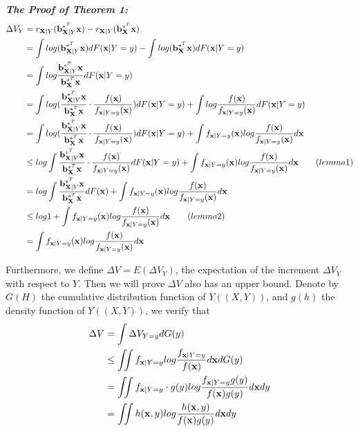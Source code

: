 \documentclass{gapd}
\begin{document}
\noindent\it{\textbf{The Proof of Theorem 1:}}
\begin{equation}
\begin{aligned}
\Delta V_Y&=r_{\mathbf{X}|Y}(\mathbf{b}_{\mathbf{X}|Y}^{*^T}\mathbf{x})-r_{\mathbf{X}|Y}(\mathbf{b}_{\mathbf{X}}^{*^T}\mathbf{x})\\
&=\int log(\mathbf{b}_{\mathbf{X}|Y}^{*^T}\mathbf{x})dF(\mathbf{x}|Y=y)-\int log(\mathbf{b}_{\mathbf{X}}^{*^T}\mathbf{x})dF(\mathbf{x}|Y=y)\\
&=\int log\frac{\mathbf{b}_{\mathbf{X}|Y}^{*^T}\mathbf{x}}{\mathbf{b}_{\mathbf{X}}^{*^T}\mathbf{x}}dF(\mathbf{x}|Y=y)\\
&=\int log(\frac{\mathbf{b}_{\mathbf{X}|Y}^{*^T}\mathbf{x}}{\mathbf{b}_{\mathbf{X}}^{*^T}\mathbf{x}}\cdot \frac{f(\mathbf{x})}{f_{\mathbf{x}|Y=y}(\mathbf{x})})dF(\mathbf{x}|Y=y)+\int log\frac{f(\mathbf{x})}{f_{\mathbf{x}|Y=y}(\mathbf{x})}dF(\mathbf{x}|Y=y)\\
&=\int log(\frac{\mathbf{b}_{\mathbf{X}|Y}^{*^T}\mathbf{x}}{\mathbf{b}_{\mathbf{X}}^{*^T}\mathbf{x}}\cdot \frac{f(\mathbf{x})}{f_{\mathbf{x}|Y=y}(\mathbf{x})})dF(\mathbf{x}|Y=y)+\int f_{\mathbf{x}|Y=y}(\mathbf{x})log\frac{f(\mathbf{x})}{f_{\mathbf{x}|Y=y}(\mathbf{x})}d\mathbf{x}\\
&\le log\int \frac{\mathbf{b}_{\mathbf{X}|Y}^{*^T}\mathbf{x}}{\mathbf{b}_{\mathbf{X}}^{*^T}\mathbf{x}}\cdot \frac{f(\mathbf{x})}{f_{\mathbf{x}|Y=y}(\mathbf{x})}dF(\mathbf{x}|Y=y)+ \int f_{\mathbf{x}|Y=y}(\mathbf{x})log\frac{f(\mathbf{x})}{f_{\mathbf{x}|Y=y}(\mathbf{x})}d\mathbf{x} \qquad(lemma 1)\\
&=log\int \frac{\mathbf{b}_{\mathbf{X}|Y}^{*^T}\mathbf{x}}{\mathbf{b}_{\mathbf{X}}^{*^T}\mathbf{x}}dF(\mathbf{x})+\int f_{\mathbf{x}|Y=y}(\mathbf{x})log\frac{f(\mathbf{x})}{f_{\mathbf{x}|Y=y}(\mathbf{x})}d\mathbf{x}\\
&\le log1+\int f_{\mathbf{x}|Y=y}(\mathbf{x})log\frac{f(\mathbf{x})}{f_{\mathbf{x}|Y=y}(\mathbf{x})}d\mathbf{x} \qquad (lemma2)\\
&=\int f_{\mathbf{x}|Y=y}(\mathbf{x})log\frac{f(\mathbf{x})}{f_{\mathbf{x}|Y=y}(\mathbf{x})}d\mathbf{x}
\end{aligned}\notag
\end{equation}

Furthermore, we define $\Delta V=E(\Delta V_Y)$, the expectation of the increment $\Delta V_Y$ with respect to $Y$. Then we will prove $\Delta V$ also has an upper bound. Denote by $G(H)$ the cumulative distribution function of $Y ((X,Y))$, and $g(h)$ the density function of $Y((X,Y))$, we verify that 
\begin{equation}
\begin{aligned}
\Delta V&=\int \Delta V_{Y=y}dG(y)\\
&\le \iint f_{\mathbf{x}|Y=y} log \frac{f_{\mathbf{x}|Y=y}}{f(\mathbf{x})}d\mathbf{x}dG(y)\\
&=\iint f_{\mathbf{x}|Y=y} \cdot g(y)log \frac{f_{\mathbf{x}|Y=y}g(y)}{f(\mathbf{x})g(y)}d\mathbf{x}dy\\
&=\iint h(\mathbf{x},y)log\frac{h(\mathbf{x},y)}{f(\mathbf{x})g(y)}d\mathbf{x}dy
\end{aligned}\notag
\end{equation}
\end{document}
